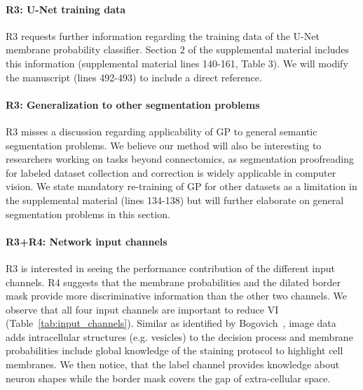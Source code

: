 \documentclass[10pt,twocolumn,letterpaper]{article}
\begin{document}
\paragraph{R3: U-Net training data} R3 requests further information regarding the training data of the U-Net membrane probability classifier. Section 2 of the supplemental material includes this information (supplemental material lines 140-161, Table 3). We will modify the manuscript (lines 492-493) to include a direct reference.

\paragraph{R3: Generalization to other segmentation problems} R3 misses a  discussion regarding applicability of GP to general semantic segmentation problems. We believe our method will also be interesting to researchers working on tasks beyond connectomics, as segmentation proofreading for labeled dataset collection and correction is widely applicable in computer vision. We state mandatory re-training of GP for other datasets as a limitation in the supplemental material (lines 134-138) but will further elaborate on general segmentation problems in this section.

\paragraph{R3+R4: Network input channels} R3 is interested in seeing the performance contribution of the different input channels. R4 suggests that the membrane probabilities and the dilated border mask provide more discriminative information than the other two channels. We observe that all four input channels are important to reduce VI (Table~\ref{tab:input_channels}). Similar as identified by Bogovich~\etal, image data adds intracellular structures (e.g. vesicles) to the decision process and membrane probabilities include global knowledge of the staining protocol to highlight cell membranes. We then notice, that the label channel provides knowledge about neuron shapes while the border mask covers the gap of extra-cellular space.

\begin{table}[h]
\caption{We evaluate automatic selection on the AC4 subvolume ($p_t=0.95$) using the GP classifier with different input channels and report median VI reduction. The combination of all four channels performs best.}
\label{tab:input_channels}
\end{table}
\end{document}
